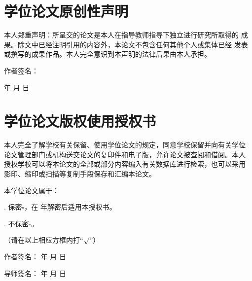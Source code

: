 \clearpage
\thispagestyle{empty}
\section*{\centering\heiti\fontsize{18pt}{27pt}\selectfont 学位论文原创性声明}
\fontsize{12pt}{18pt}\selectfont
本人郑重声明：所呈交的论文是本人在指导教师指导下独立进行研究所取得的
成果。除文中已经注明引用的内容外，本论文不包含任何其他个人或集体已经
发表或撰写的成果作品。本人完全意识到本声明的法律后果由本人承担。

\vspace{2cm}

\begin{flushright}
    作者签名：\hspace{9em}

    年\;\;\; 月\;\;\; 日
\end{flushright}

\vspace{3cm}

\section*{\centering\heiti\fontsize{18pt}{27pt}\selectfont 学位论文版权使用授权书}
\fontsize{12pt}{18pt}\selectfont
本人完全了解学校有关保留、使用学位论文的规定，同意学校保留并向有关学位
论文管理部门或机构送交论文的复印件和电子版，允许论文被查阅和借阅。本人
授权学校可以将本论文的全部或部分内容编入有关数据库进行检索，也可以采用
影印、缩印或扫描等复制手段保存和汇编本论文。

\vspace{1cm}

\noindent 本学位论文属于：\par
{}. 保密$\square$，在 \;\;\;\; 年解密后适用本授权书。\par
{}. 不保密$\square$。\par
\indent （请在以上相应方框内打“$\surd$”）

\vspace{1cm}

\begin{flushright}
    作者签名：\hspace{9ex} 年\hspace{3ex} 月\hspace{4ex} 日

    导师签名：\hspace{9ex} 年\hspace{3ex} 月\hspace{4ex} 日
\end{flushright}
